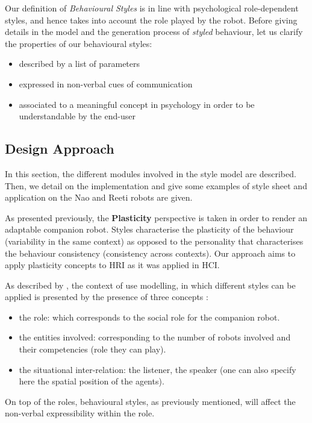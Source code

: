 \documentclass[a4paper,twocolumn]{svjour3}
\begin{document}
Our definition of \emph{Behavioural Styles} is in line with psychological role-dependent styles, and hence takes into account the role played by the robot.
Before giving details in the model and the generation process of \textit{styled} behaviour, let us clarify the properties of our behavioural styles:
\begin{itemize}[noitemsep]
	\item described by a list of parameters
	\item expressed in non-verbal cues of communication
	\item associated to a meaningful concept in psychology in order to be understandable by the end-user
\end{itemize}


\subsection{Design Approach}
In this section, the different modules involved in the style model are described. 
Then, we detail on the implementation and give some examples of style sheet and application on the Nao  and Reeti robots are given.


As presented previously, the \textbf{Plasticity} perspective is taken in order to render an adaptable companion robot.
Styles characterise the plasticity of the behaviour (variability in the same context) as opposed to the personality that characterises the behaviour consistency (consistency across contexts).
Our approach aims to apply plasticity concepts to HRI as it was applied in HCI. 

As described by \cite{Coutaz2012}, the context of use modelling, in which different styles can be applied is presented by the presence of three concepts :
\begin{itemize}[noitemsep,nolistsep]
\item the role: which corresponds to the social role for the companion robot.
\item the entities involved: corresponding to the number of robots involved and their competencies (role they can play).
\item the situational inter-relation: the listener, the speaker (one can also specify here the spatial position of the agents).
\end{itemize}


On top of the roles, behavioural styles, as previously mentioned, will affect the non-verbal expressibility within the role.
\end{document}
